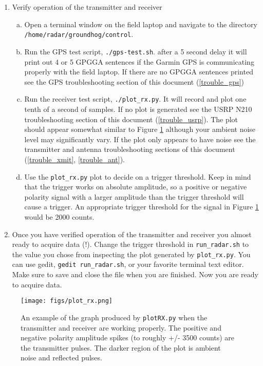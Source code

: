\documentclass[titlepage]{article}
\begin{document}
\begin{enumerate}[1.]
    \item Verify operation of the transmitter and receiver \begin{enumerate}[(a)]
        \item Open a terminal window on the field laptop and navigate to the directory \\\verb+/home/radar/groundhog/control+.
        \item Run the GPS test script, \verb+./gps-test.sh+. after a 5 second delay it will print out 4 or 5 GPGGA sentences if the Garmin GPS is communicating properly with the field laptop. If there are no GPGGA sentences printed see the GPS troubleshooting section of this document (\ref{trouble_gps}) 
        \item Run the receiver test script, \verb+./plot_rx.py+. It will record and plot one tenth of a second of samples. If no plot is generated see the USRP N210 troubleshooting section of this document (\ref{trouble_usrp}). The plot should appear somewhat similar to Figure \ref{fig:plot_rx} although your ambient noise level may significantly vary. If the plot only appears to have noise see the transmitter and antenna troubleshooting sections of this document (\ref{trouble_xmit}, \ref{trouble_ant}).
        \item Use the \verb+plot_rx.py+ plot to decide on a trigger threshold. Keep in mind that the trigger works on absolute amplitude, so a positive or negative polarity signal with a larger amplitude than the trigger threshold will cause a trigger. An appropriate trigger threshold for the signal in Figure \ref{fig:plot_rx} would be 2000 counts.
    \end{enumerate}

    \item Once you have verified operation of the transmitter and receiver you almost ready to acquire data (!). Change the trigger threshold in \verb+run_radar.sh+ to the value you chose from inspecting the plot generated by \verb+plot_rx.py+. You can use gedit, \verb+gedit run_radar.sh+, or your favorite terminal text editor. Make sure to save and close the file when you are finished. Now you are ready to acquire data.
\end{enumerate}

\begin{figure}[h]
\centering
\texttt{[image: figs/plot\_rx.png]}
\cprotect\caption{An example of the graph produced by \verb:plotRX.py: when the transmitter and receiver are working properly. The positive and negative polarity amplitude spikes (to roughly +/- 3500 counts) are the transmitter pulses. The darker region of the plot is ambient noise and reflected pulses.}
\label{fig:plot_rx}
\end{figure}
\end{document}
